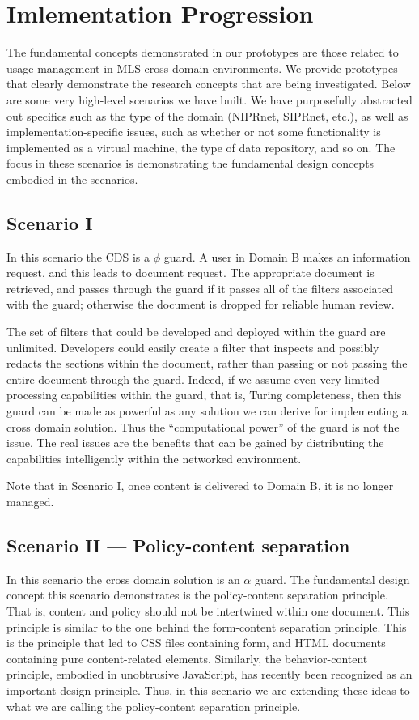 \section{Imlementation Progression}
The fundamental concepts demonstrated in our prototypes are those related to usage management in MLS cross-domain environments. We provide prototypes that clearly demonstrate the research concepts that are being investigated. Below are some very high-level scenarios we have built. We have purposefully abstracted out specifics such as the type of the domain (NIPRnet, SIPRnet, etc.), as well as implementation-specific issues, such as whether or not some functionality is implemented as a virtual machine, the type of data repository, and so on. The focus in these scenarios is demonstrating the fundamental design concepts embodied in the scenarios.

\subsection{Scenario I}
In this scenario the CDS is a $\phi$ guard. A user in Domain B makes an information request, and this leads to document request. The appropriate document is retrieved, and passes through the guard if it passes all of the filters associated with the guard; otherwise the document is dropped for reliable human review.

The set of filters that could be developed and deployed within the guard are unlimited.  Developers could easily create a filter that inspects and possibly redacts the sections within the document, rather than passing or not passing the entire document through the guard.  Indeed, if we assume even very limited processing capabilities within the guard, that is, Turing completeness, then this guard can be made as powerful as any solution we can derive for implementing a cross domain solution. Thus the “computational power” of the guard is not the issue. The real issues are the benefits that can be gained by distributing the capabilities intelligently within the networked environment.

Note that in Scenario I, once content is delivered to Domain B, it is no longer managed.

\subsection{Scenario II --- Policy-content separation}
In this scenario the cross domain solution is an $\alpha$ guard. The fundamental design concept this scenario demonstrates is the policy-content separation principle. That is, content and policy should not be intertwined within one document.  This principle is similar to the one behind the form-content separation principle. This is the principle that led to CSS files containing form, and HTML documents containing pure content-related elements. Similarly, the behavior-content principle, embodied in unobtrusive JavaScript, has recently been recognized as an important design principle. Thus, in this scenario we are extending these ideas to what we are calling the policy-content separation principle.


